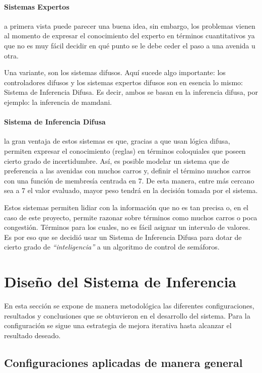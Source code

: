 \paragraph{Sistemas Expertos} a primera vista puede parecer una buena idea, sin embargo, los problemas vienen al momento de expresar el conocimiento del experto en términos cuantitativos ya que no es muy fácil decidir en qué punto se le debe ceder el paso a una avenida u otra.

Una variante, son los sistemas difusos. Aquí sucede algo importante: los controladores difusos y los sistemas expertos difusos son en esencia lo mismo: Sistema de Inferencia Difusa. Es decir, ambos se basan en la inferencia difusa, por ejemplo: la inferencia de mamdani.

\paragraph{Sistema de Inferencia Difusa} la gran ventaja de estos sistemas es que, gracias a que usan lógica difusa, permiten expresar el conocimiento (reglas) en términos coloquiales que poseen cierto grado de incertidumbre. Así, es posible modelar un sistema que de preferencia a las avenidas con muchos carros y, definir el término muchos carros con una función de membresía centrada en 7. De esta manera, entre más cercano sea a 7 el valor evaluado, mayor peso tendrá en la decisión tomada por el sistema.

Estos sistemas permiten lidiar con la información que no es tan precisa o, en el caso de este proyecto, permite razonar sobre términos como muchos carros o poca congestión. Términos para los cuales, no es fácil asignar un intervalo de valores. Es por eso que se decidió usar un Sistema de Inferencia Difusa para dotar de cierto grado de \textit{``inteligencia''} a un algoritmo de control de semáforos.

\section{Diseño del Sistema de Inferencia}\label{section:desarrolloFIS}
En esta sección se expone de manera metodológica las diferentes configuraciones, resultados y conclusiones que se obtuvieron en el desarrollo del sistema. Para la configuración se sigue una estrategia de mejora iterativa hasta alcanzar el resultado deseado.

\subsection{Configuraciones aplicadas de manera general}

